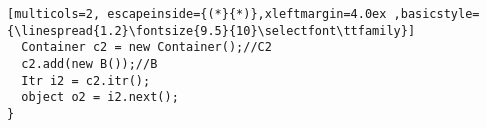 \begin{figure*}
\begin{center}
\begin{lstlisting}[multicols=2, escapeinside={(*}{*)},xleftmargin=4.0ex ,basicstyle={\linespread{1.2}\fontsize{9.5}{10}\selectfont\ttfamily}]
  Container c2 = new Container();//C2
  c2.add(new B());//B
  Itr i2 = c2.itr();
  object o2 = i2.next();
}
\end{lstlisting}
%				
%				
%				
%				
%				
%				
%				
%				
%				
%				
%				

\end{center}
\end{figure*}
